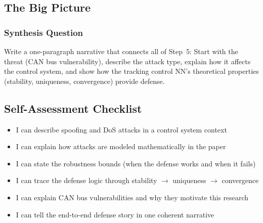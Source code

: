 \begin{answerbox}\end{answerbox}

\subsection{The Big Picture}

\subsubsection*{Synthesis Question}

Write a one-paragraph narrative that connects all of Step~5: Start with the threat (CAN bus vulnerability), describe the attack type, explain how it affects the control system, and show how the tracking control NN's theoretical properties (stability, uniqueness, convergence) provide defense.

\begin{largeanswer}\end{largeanswer}

\subsection*{Self-Assessment Checklist}

\begin{itemize}[leftmargin=2em, label=$\square$]
  \item I can describe spoofing and DoS attacks in a control system context
  \item I can explain how attacks are modeled mathematically in the paper
  \item I can state the robustness bounds (when the defense works and when it fails)
  \item I can trace the defense logic through stability $\to$ uniqueness $\to$ convergence
  \item I can explain CAN bus vulnerabilities and why they motivate this research
  \item I can tell the end-to-end defense story in one coherent narrative
\end{itemize}

\begin{notesbox}\end{notesbox}
